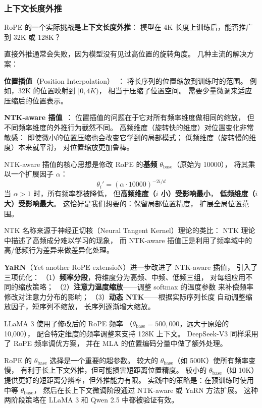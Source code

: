 \subsubsection{上下文长度外推}

RoPE 的一个实际挑战是\textbf{上下文长度外推}：
模型在 4K 长度上训练后，能否推广到 32K 或 128K？

直接外推通常会失败，因为模型没有见过高位置的旋转角度。
几种主流的解决方案：

\textbf{位置插值}（Position Interpolation）~\cite{chen2023extending}：
将长序列的位置缩放到训练时的范围。
例如，32K 的位置映射到 $[0, 4K)$，
相当于压缩了位置空间。
需要少量微调来适应压缩后的位置表示。

\textbf{NTK-aware 插值}~\cite{bloc97ntk}：
位置插值的问题在于它对所有频率维度做相同的缩放，
但不同频率维度的外推行为截然不同。
高频维度（旋转快的维度）对位置变化非常敏感：
即使微小的位置压缩也会改变它学到的局部模式；
低频维度（旋转慢的维度）本来就平滑，
对位置缩放更加鲁棒。

NTK-aware 插值的核心思想是修改 RoPE 的\textbf{基频}
$\theta_{\mathrm{base}}$（原始为 10000），
将其乘以一个扩展因子 $\alpha$：
\[
  \theta_i' = (\alpha \cdot 10000)^{-2i/d}
\]
当 $\alpha > 1$ 时，所有频率都被降低，
但\textbf{高频维度（$i$ 小）受影响最小}，
\textbf{低频维度（$i$ 大）受影响最大}。
这恰好是我们想要的：保留局部位置精度，
扩展全局位置范围。

NTK 名称来源于神经正切核（Neural Tangent Kernel）理论的类比：
NTK 理论中描述了高频成分难以学习的现象，
而 NTK-aware 插值正是利用了频率域中的
高/低频行为差异来做差异化处理。

\textbf{YaRN}（Yet another RoPE extensioN）进一步改进了 NTK-aware 插值，
引入了三项优化：
（1）\textbf{频率分段}，将维度分为高频、中频、低频三组，
对每组应用不同的缩放策略；
（2）\textbf{注意力温度缩放}——调整 softmax 的温度参数
来补偿频率修改对注意力分布的影响；
（3）\textbf{动态 NTK}——根据实际序列长度
自动调整缩放因子，短序列不缩放，
长序列逐渐增大缩放。

LLaMA 3 使用了修改后的 RoPE 频率
（$\theta_{\mathrm{base}} = 500{,}000$，远大于原始的 10{,}000），
配合特定维度的频率调整来支持 128K 上下文。
DeepSeek-V3 同样采用了 RoPE 频率调优方案，
并在 MLA 的位置编码分量中做了额外处理。

\begin{corebox}
RoPE 的 $\theta_{\mathrm{base}}$ 选择是一个重要的超参数。
较大的 $\theta_{\mathrm{base}}$（如 500K）使所有频率变慢，
有利于长上下文外推，但可能损害短距离位置精度。
较小的 $\theta_{\mathrm{base}}$（如 10K）
提供更好的短距离分辨率，但外推能力有限。
实践中的策略是：在预训练时使用中等 $\theta_{\mathrm{base}}$，
然后在长上下文微调阶段通过 NTK-aware 或 YaRN 方法扩展。
这种两阶段策略在 LLaMA 3 和 Qwen 2.5 中都被验证有效。
\end{corebox}

